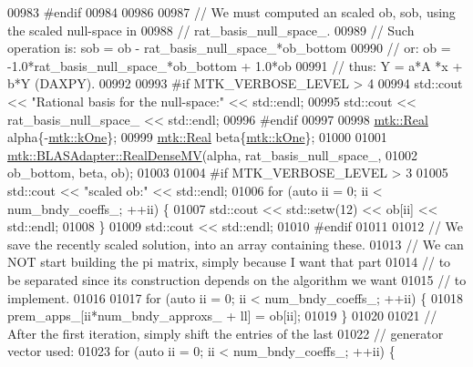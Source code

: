 \begin{DoxyCode}
{{00983 \textcolor{preprocessor}{    #endif}
00984 
00986 
00987     \textcolor{comment}{// We must computed an scaled ob, sob, using the scaled null-space in}
00988     \textcolor{comment}{// rat\_basis\_null\_space\_.}
00989     \textcolor{comment}{// Such operation is: sob = ob - rat\_basis\_null\_space\_*ob\_bottom}
00990     \textcolor{comment}{// or:                 ob = -1.0*rat\_basis\_null\_space\_*ob\_bottom + 1.0*ob}
00991     \textcolor{comment}{// thus:                Y =    a*A    *x         +   b*Y (DAXPY).}
00992 
00993 \textcolor{preprocessor}{    #if MTK\_VERBOSE\_LEVEL > 4}
00994     std::cout << \textcolor{stringliteral}{"Rational basis for the null-space:"} << std::endl;
00995     std::cout << rat\_basis\_null\_space\_ << std::endl;
00996 \textcolor{preprocessor}{    #endif}
00997 
00998     \hyperlink{group__c01-roots_gac080bbbf5cbb5502c9f00405f894857d}{mtk::Real} alpha\{-\hyperlink{group__c01-roots_ga26407c24d43b6b95480943340d285c71}{mtk::kOne}\};
00999     \hyperlink{group__c01-roots_gac080bbbf5cbb5502c9f00405f894857d}{mtk::Real} beta\{\hyperlink{group__c01-roots_ga26407c24d43b6b95480943340d285c71}{mtk::kOne}\};
01000 
01001     \hyperlink{classmtk_1_1BLASAdapter_afdcac059a4294287cb55638221220646}{mtk::BLASAdapter::RealDenseMV}(alpha, rat\_basis\_null\_space\_,
01002                                   ob\_bottom, beta, ob);
01003 
01004 \textcolor{preprocessor}{    #if MTK\_VERBOSE\_LEVEL > 3}
01005     std::cout << \textcolor{stringliteral}{"scaled ob:"} << std::endl;
01006     \textcolor{keywordflow}{for} (\textcolor{keyword}{auto} ii = 0; ii < num\_bndy\_coeffs\_; ++ii) \{
01007       std::cout << std::setw(12) << ob[ii] << std::endl;
01008     \}
01009     std::cout << std::endl;
01010 \textcolor{preprocessor}{    #endif}
01011 
01012     \textcolor{comment}{// We save the recently scaled solution, into an array containing these.}
01013     \textcolor{comment}{// We can NOT start building the pi matrix, simply because I want that part}
01014     \textcolor{comment}{// to be separated since its construction depends on the algorithm we want}
01015     \textcolor{comment}{// to implement.}
01016 
01017     \textcolor{keywordflow}{for} (\textcolor{keyword}{auto} ii = 0; ii < num\_bndy\_coeffs\_; ++ii) \{
01018       prem\_apps\_[ii*num\_bndy\_approxs\_ + ll] = ob[ii];
01019     \}
01020 
01021     \textcolor{comment}{// After the first iteration, simply shift the entries of the last}
01022     \textcolor{comment}{// generator vector used:}
01023     \textcolor{keywordflow}{for} (\textcolor{keyword}{auto} ii = 0; ii < num\_bndy\_coeffs\_; ++ii) \{
}}
\end{DoxyCode}
